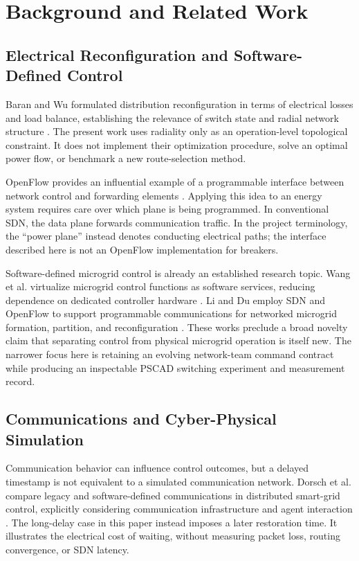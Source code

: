 \section{Background and Related Work}
\subsection{Electrical Reconfiguration and Software-Defined Control}
Baran and Wu formulated distribution reconfiguration in terms of electrical
losses and load balance, establishing the relevance of switch state and radial
network structure \cite{baran1989}. The present work uses radiality only as an
operation-level topological constraint. It does not implement their optimization
procedure, solve an optimal power flow, or benchmark a new route-selection
method.

OpenFlow provides an influential example of a programmable interface between
network control and forwarding elements \cite{mckeown2008}. Applying this idea
to an energy system requires care over which plane is being programmed. In
conventional SDN, the data plane forwards communication traffic. In the project
terminology, the ``power plane'' instead denotes conducting electrical paths;
the interface described here is not an OpenFlow implementation for breakers.

Software-defined microgrid control is already an established research topic.
Wang et al. virtualize microgrid control functions as software services,
reducing dependence on dedicated controller hardware \cite{wang2020}. Li and
Du employ SDN and OpenFlow to support programmable communications for networked
microgrid formation, partition, and reconfiguration \cite{li2021}. These works
preclude a broad novelty claim that separating control from physical microgrid
operation is itself new. The narrower focus here is retaining an evolving
network-team command contract while producing an inspectable PSCAD switching
experiment and measurement record.

\subsection{Communications and Cyber-Physical Simulation}
Communication behavior can influence control outcomes, but a delayed timestamp
is not equivalent to a simulated communication network. Dorsch et al. compare
legacy and software-defined communications in distributed smart-grid control,
explicitly considering communication infrastructure and agent interaction
\cite{dorsch2017}. The long-delay case in this paper instead imposes a later
restoration time. It illustrates the electrical cost of waiting, without
measuring packet loss, routing convergence, or SDN latency.

